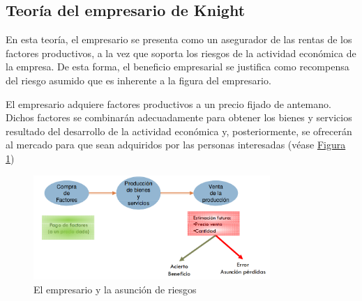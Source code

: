 \documentclass[12pt,a4paper,spanish]{report}
\begin{document}
		\subsection{\textcolor[rgb]{0.9,0.3,0.3}Teoría del empresario de Knight}
			En esta teoría, el empresario se presenta como un asegurador de las rentas de los factores productivos, a la vez que soporta los riesgos de la actividad económica de la empresa. De esta forma, el beneficio empresarial se justifica como recompensa del riesgo asumido que es inherente a la figura del empresario.

			El empresario adquiere factores productivos a un precio fijado de antemano. Dichos factores se combinarán adecuadamente para obtener los bienes y servicios resultado del desarrollo de la actividad económica y, posteriormente, se ofrecerán al mercado para que sean adquiridos por las personas interesadas (véase \hyperref[empresario_riesgos]{Figura \ref*{empresario_riesgos}})

			\begin{figure}
			 	\centering
			 		\includegraphics[width=0.8\textwidth]{2}
			 	\caption{El empresario y la asunción de riesgos}
			 	\label{empresario_riesgos}
			 \end{figure}
\end{document}
